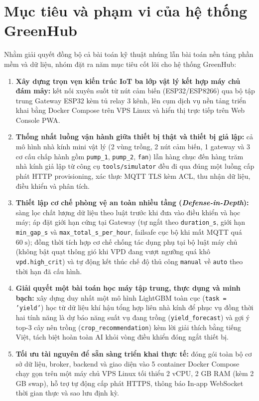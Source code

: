 \section{Mục tiêu và phạm vi của hệ thống GreenHub}
\label{sec:c1-goals-scope}

Nhằm giải quyết đồng bộ cả bài toán kỹ thuật nhúng lẫn bài toán nền tảng phần mềm và dữ liệu, nhóm đặt ra năm mục tiêu cốt lõi cho hệ thống GreenHub:

\begin{enumerate}[leftmargin=*]
    \item \textbf{Xây dựng trọn vẹn kiến trúc IoT ba lớp vật lý kết hợp máy chủ đám mây:} kết nối xuyên suốt từ nút cảm biến (ESP32/ESP8266) qua bộ tập trung Gateway ESP32 kèm tủ relay 3 kênh, lên cụm dịch vụ nền tảng triển khai bằng Docker Compose trên VPS Linux và hiển thị trực tiếp trên Web Console PWA.
    \item \textbf{Thống nhất luồng vận hành giữa thiết bị thật và thiết bị giả lập:} cả mô hình nhà kính mini vật lý (2 vùng trồng, 2 nút cảm biến, 1 gateway và 3 cơ cấu chấp hành gồm \texttt{pump\_1}, \texttt{pump\_2}, \texttt{fan}) lẫn hàng chục đến hàng trăm nhà kính giả lập từ công cụ \texttt{tools/simulator} đều đi qua đúng một luồng cấp phát HTTP provisioning, xác thực MQTT TLS kèm ACL, thu nhận dữ liệu, điều khiển và phân tích.
    \item \textbf{Thiết lập cơ chế phòng vệ an toàn nhiều tầng (\textit{Defense-in-Depth}):} sàng lọc chất lượng dữ liệu theo luật trước khi đưa vào điều khiển và học máy; áp đặt giới hạn cứng tại Gateway (tự ngắt theo \texttt{duration\_s}, giới hạn \texttt{min\_gap\_s} và \texttt{max\_total\_s\_per\_hour}, failsafe cục bộ khi mất MQTT quá \(60\;\text{s}\)); đồng thời tích hợp cơ chế chống tác dụng phụ tại bộ luật máy chủ (không bật quạt thông gió khi VPD đang vượt ngưỡng quá khô \texttt{vpd.high\_crit}) và tự động kết thúc chế độ thủ công \texttt{manual} về \texttt{auto} theo thời hạn đã cấu hình.
    \item \textbf{Giải quyết một bài toán học máy tập trung, thực dụng và minh bạch:} xây dựng duy nhất một mô hình LightGBM toàn cục (\texttt{task = 'yield'}) học từ dữ liệu khí hậu tổng hợp liên nhà kính để phục vụ đồng thời hai tính năng là dự báo năng suất vụ đang trồng (\texttt{yield\_forecast}) và gợi ý top-3 cây nên trồng (\texttt{crop\_recommendation}) kèm lời giải thích bằng tiếng Việt, tách biệt hoàn toàn AI khỏi vòng điều khiển đóng ngắt thiết bị.
    \item \textbf{Tối ưu tài nguyên để sẵn sàng triển khai thực tế:} đóng gói toàn bộ cơ sở dữ liệu, broker, backend và giao diện vào 5 container Docker Compose chạy gọn trên một máy chủ VPS Linux tối thiểu 2 vCPU, 2 GB RAM (kèm 2 GB swap), hỗ trợ tự động cấp phát HTTPS, thông báo In-app WebSocket thời gian thực và sao lưu định kỳ.
\end{enumerate}

